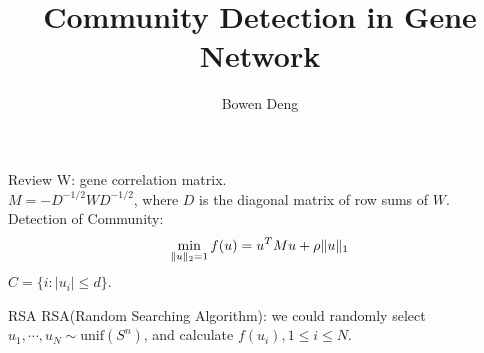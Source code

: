 \documentclass[xcolor=dvipsnames]{beamer}
\begin{document}
\title{Community Detection in Gene Network}
\author{Bowen Deng}
\date{}
\begin{frame}
\maketitle
\end{frame}
\begin{frame}
\tableofcontents
\end{frame}
\begin{frame}{Review}
W: gene correlation matrix.\\
$M=-D^{-1/2}WD^{-1/2}$, where $D$ is the diagonal matrix of row sums of $W$.\\
Detection of Community:\\
\[
\min_{\substack \|u\|_2=1} f(u)=u^TMu+\rho\|u\|_1
\]
$C=\{i:|u_i|\leqslant d\}$.
\end{frame}
\begin{frame}{RSA}
RSA(Random Searching Algorithm): we could randomly select $u_1,\cdots,u_N\sim \text{unif}(S^n)$, and calculate $f(u_i), 1\leqslant i\leqslant N$.\\

\end{frame}
\end{document}
